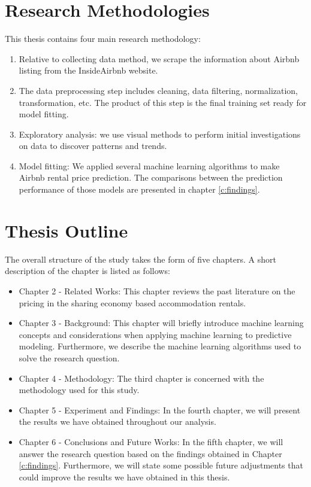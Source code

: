 \section{Research Methodologies}
This thesis contains four main research methodology:
\begin{enumerate}
\item Relative to collecting data method, we scrape the information about Airbnb
  listing from the InsideAirbnb website.
\item The data preprocessing step includes cleaning, data filtering,
  normalization, transformation, etc. The product of this step is the final
  training set ready for model fitting.
\item Exploratory analysis: we use visual methods to perform initial
  investigations on data to discover patterns and trends.
\item Model fitting:
  We applied several machine learning algorithms to make Airbnb rental price
  prediction.  The comparisons between the prediction performance of those
  models are presented in chapter \ref{c:findings}.
\end{enumerate}

\section{Thesis Outline}
The overall structure of the study takes the form of five chapters. A short
description of the chapter is listed as follows:

\begin{itemize}
\item Chapter 2 - Related Works: This chapter reviews the past literature on the
pricing in the sharing economy based accommodation rentals.
\item Chapter 3 - Background: This chapter will briefly introduce machine
  learning concepts and considerations when applying machine learning to predictive
  modeling. Furthermore,  we describe the machine learning algorithms used to
  solve the research question.
\item Chapter 4 - Methodology: The third chapter is concerned with the
  methodology used for this study.
\item Chapter 5 - Experiment and Findings: In the fourth chapter, we will present the results
  we have obtained throughout our analysis.
\item Chapter 6 - Conclusions and Future Works: In the fifth chapter, we will
  answer the research question based on the findings obtained in Chapter
  \ref{c:findings}.
  Furthermore, we will state some possible future adjustments that could improve
  the results we have obtained in this thesis.
\end{itemize}

